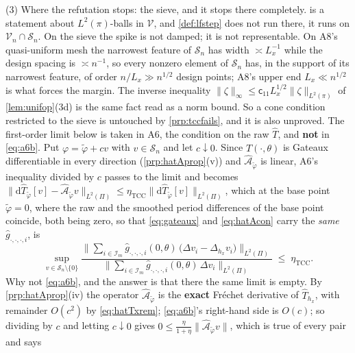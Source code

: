 \begin{remark}
(3) Where the refutation stops: the sieve, and it stops there completely.  is
a statement about $L^{2}(\pi)$-balls in $\mathcal V$, and \cref{def:lfstep} does not run there, it
runs on $\mathcal V_n\cap\mathcal S_n$. On the sieve the spike is not damped; it is not
representable. On A8's quasi-uniform mesh the narrowest feature of $\mathcal S_n$ has width
$\asymp L_x^{-1}$ while the design spacing is $\asymp n^{-1}$, so every nonzero element of
$\mathcal S_n$ has, in the support of its narrowest feature, of order $n/L_x\gg n^{1/2}$ design points;
A8's upper end $L_x\ll n^{1/2}$ is what forces the margin. The inverse inequality
$\|\zeta\|_\infty\le\mathsf c_{11}L_x^{1/2}\|\zeta\|_{L^{2}(\pi)}$ of \cref{lem:unifop}(3d) is the same
fact read as a norm bound. So a cone condition restricted to the sieve is untouched by
\cref{prp:tccfails}, and it is also unproved. The first-order limit below is taken in A6, the
condition on the raw $\hat T$, and \textbf{not} in \eqref{eq:a6b}. Put $\varphi=\tilde\varphi+cv$ with
$v\in\mathcal S_n$
and let $c\downarrow0$. Since $\hat T(\cdot,\theta)$ is Gateaux differentiable in every direction
(\cref{prp:hatAprop}(v)) and $\hat{\mathcal A}_{\tilde\varphi}$ is linear, A6's inequality divided by
$c$ passes to the limit and becomes
$\|\mathrm d\hat T_{\tilde\varphi}[v]-\hat{\mathcal A}_{\tilde\varphi}v\|_{L^{2}(\Pi)}
\le\eta_{\mathrm{TCC}}\|\mathrm d\hat T_{\tilde\varphi}[v]\|_{L^{2}(\Pi)}$, which at the base point
$\tilde\varphi=0$, where the raw and the smoothed period differences of the base point coincide, both
being zero, so that \eqref{eq:gateaux} and \eqref{eq:hatAcon} carry the \emph{same}
$\hat g_{\cdot,\cdot,\cdot,i}$, is
\begin{equation}\label{eq:a6sieve}
\sup_{v\in\mathcal S_n\setminus\{0\}}
\frac{\big\|\sum_{i\in\mathcal I_m}\hat g_{\cdot,\cdot,\cdot,i}(0,\theta)\,\big(\Delta v_i-\Delta_{h_x}v_i\big)\big\|_{L^{2}(\Pi)}}
{\big\|\sum_{i\in\mathcal I_m}\hat g_{\cdot,\cdot,\cdot,i}(0,\theta)\,\Delta v_i\big\|_{L^{2}(\Pi)}}
\;\le\;\eta_{\mathrm{TCC}} .
\end{equation}
Why not \eqref{eq:a6b}, and the answer is that there the same limit is empty. By
\cref{prp:hatAprop}(iv) the operator $\hat{\mathcal A}_{\tilde\varphi}$ is the \textbf{exact} Fr\'echet
derivative of $\hat T_{h_x}$, with remainder $O(c^{2})$ by \eqref{eq:hatTxrem}; \eqref{eq:a6b}'s
right-hand side is $O(c)$; so dividing by $c$ and letting $c\downarrow0$ gives
$0\le\tfrac{\eta}{1+\eta}\|\hat{\mathcal A}_{\tilde\varphi}v\|$, which is true of every pair and says

\end{remark}
